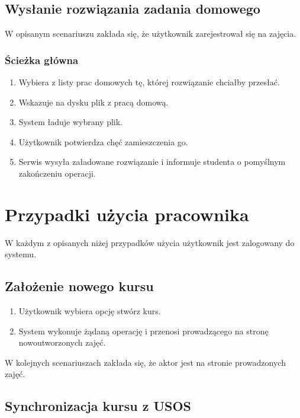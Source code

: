 \documentclass{pracamgr}
\begin{document}
\subsection{Wysłanie rozwiązania zadania domowego}

W opisanym scenariuszu zakłada się, że użytkownik zarejestrował się na zajęcia.

\subsubsection{Ścieżka główna}

\begin{enumerate}
   \item Wybiera z listy prac domowych tę, której rozwiązanie chciałby przesłać.
   \item Wskazuje na dysku plik z pracą domową.
   \item System ładuje wybrany plik.
   \item Użytkownik potwierdza chęć zamieszczenia go.
   \item Serwis wysyła załadowane rozwiązanie i informuje studenta o pomyślnym 
      zakończeniu operacji.
\end{enumerate}

\section{Przypadki użycia pracownika}

W każdym z opisanych niżej przypadków użycia użytkownik jest zalogowany do
systemu.

\subsection{Założenie nowego kursu}

\begin{enumerate}
   \item Użytkownik wybiera opcję stwórz kurs.
   \item System wykonuje żądaną operację i przenosi prowadzącego na stronę
      nowoutworzonych zajęć.
\end{enumerate}

W kolejnych scenariuszach zakłada się, że aktor jest na stronie 
prowadzonych zajęć.

\subsection{Synchronizacja kursu z USOS}
\end{document}

